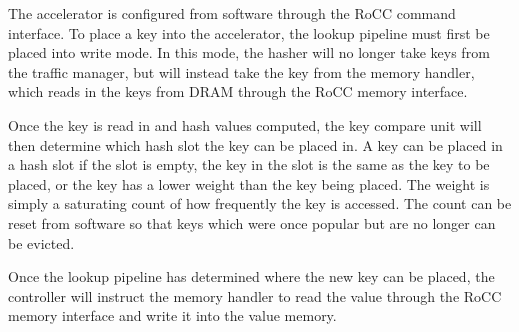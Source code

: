 The accelerator is configured from software through the RoCC command interface.
To place a key into the accelerator, the lookup pipeline must first be
placed into write mode. In this mode, the hasher will no longer take keys
from the traffic manager, but will instead take the key from the memory handler,
which reads in the keys from DRAM through the RoCC memory interface.

Once the key is read in and hash values computed, the key compare unit will
then determine which hash slot the key can be placed in. A key can be placed
in a hash slot if the slot is empty, the key in the slot is the same as the
key to be placed, or the key has a lower weight than the key being placed.
The weight is simply a saturating count of how frequently the key is accessed.
The count can be reset from software so that keys which were once popular but
are no longer can be evicted.

Once the lookup pipeline has determined where the new key can be placed, the
controller will instruct the memory handler to read the value through the
RoCC memory interface and write it into the value memory.
